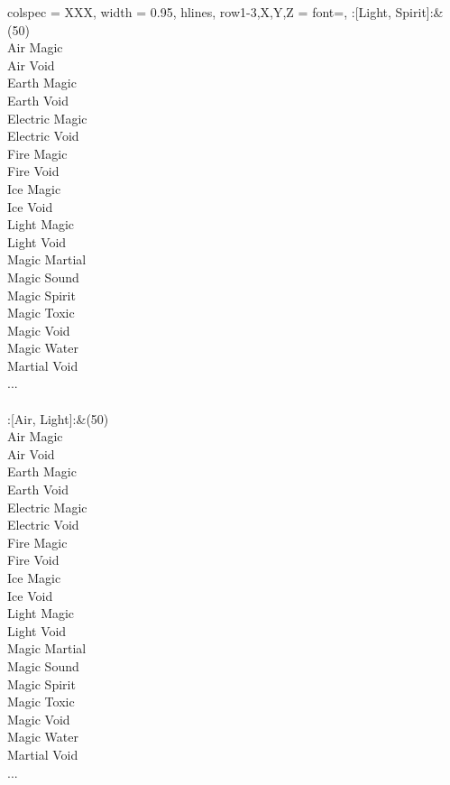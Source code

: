 \begin{longtblr}[
	caption = {2v2 Attacking Effective},
	label = {2v2-Attacking-Effective},
]{
	colspec = {XXX}, width = 0.95\linewidth,
	hlines,
	row{1-3,X,Y,Z} = {font=\bfseries},
}
	:[Light, Spirit]:&{(50)\\
	Air Magic \\
	Air Void \\
	Earth Magic \\
	Earth Void \\
	Electric Magic \\
	Electric Void \\
	Fire Magic \\
	Fire Void \\
	Ice Magic \\
	Ice Void \\
	Light Magic \\
	Light Void \\
	Magic Martial \\
	Magic Sound \\
	Magic Spirit \\
	Magic Toxic \\
	Magic Void \\
	Magic Water \\
	Martial Void \\
	...\\
	}\\

	:[Air, Light]:&{(50)\\
	Air Magic \\
	Air Void \\
	Earth Magic \\
	Earth Void \\
	Electric Magic \\
	Electric Void \\
	Fire Magic \\
	Fire Void \\
	Ice Magic \\
	Ice Void \\
	Light Magic \\
	Light Void \\
	Magic Martial \\
	Magic Sound \\
	Magic Spirit \\
	Magic Toxic \\
	Magic Void \\
	Magic Water \\
	Martial Void \\
	...\\
	}\\


\end{longtblr}

